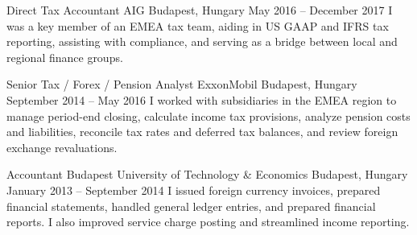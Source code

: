 \begin{cventries}

  \cventry
    {Direct Tax Accountant} %
    {AIG} %
    {Budapest, Hungary} %
    {May 2016 -- December 2017} %
    {I was a key member of an EMEA tax team, aiding in US GAAP and IFRS tax reporting, assisting with compliance, and serving as a bridge between local and regional finance groups.} %
    {} %


  \cventry
    {Senior Tax / Forex / Pension Analyst} %
    {ExxonMobil} %
    {Budapest, Hungary} %
    {September 2014 -- May 2016} %
    {I worked with subsidiaries in the EMEA region to manage period-end closing, calculate income tax provisions, analyze pension costs and liabilities, reconcile tax rates and deferred tax balances, and review foreign exchange revaluations.} %
    {} %


  \cventry
    {Accountant} %
    {Budapest University of Technology \& Economics} %
    {Budapest, Hungary} %
    {January 2013 -- September 2014} %
    {I issued foreign currency invoices, prepared financial statements, handled general ledger entries, and prepared financial reports. I also improved service charge posting and streamlined income reporting.} %
    {} %


\end{cventries}
